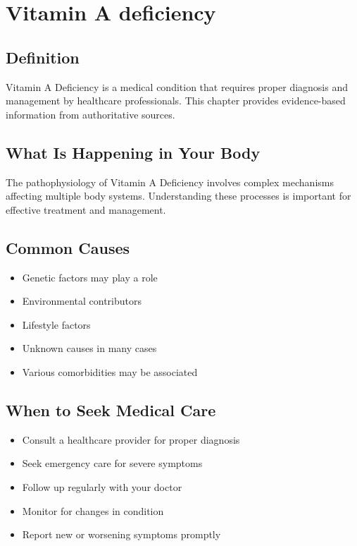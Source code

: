 
\chapter{Vitamin A deficiency}

\section*{Definition}
Vitamin A Deficiency is a medical condition that requires proper diagnosis and management by healthcare professionals. This chapter provides evidence-based information from authoritative sources.

\section*{What Is Happening in Your Body}
The pathophysiology of Vitamin A Deficiency involves complex mechanisms affecting multiple body systems. Understanding these processes is important for effective treatment and management.

\section*{Common Causes}
\begin{itemize}
  \item Genetic factors may play a role
  \item Environmental contributors
  \item Lifestyle factors
  \item Unknown causes in many cases
  \item Various comorbidities may be associated
\end{itemize}

\section*{When to Seek Medical Care}
\begin{itemize}
  \item Consult a healthcare provider for proper diagnosis
  \item Seek emergency care for severe symptoms
  \item Follow up regularly with your doctor
  \item Monitor for changes in condition
  \item Report new or worsening symptoms promptly
\end{itemize}

